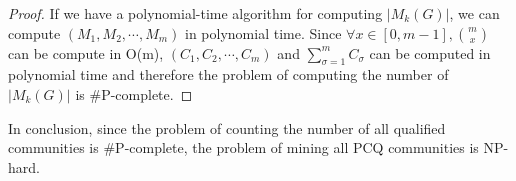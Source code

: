 \begin{proof}
If we have a polynomial-time algorithm for computing $|M_k(G)|$, we can compute $(M_1,M_2,\cdots,M_m)$ in polynomial time. Since $ \forall x \in [0,m-1], \binom{m}{x}$ can be compute in O(m), $(C_1,C_2,\cdots,C_m)$ and $\sum_{\sigma=1}^{m}{C_\sigma}$ can be computed in polynomial time and therefore the problem of computing the number of $|M_k(G)|$ is $\#$P-complete.    
\end{proof}

In conclusion, since the problem of counting the number of all qualified communities is $\#$P-complete, the problem of mining all PCQ communities is NP-hard.



